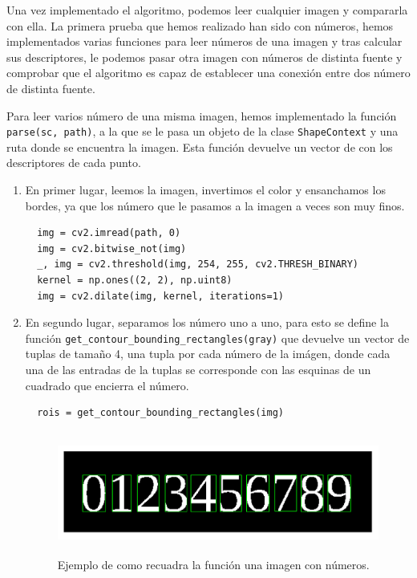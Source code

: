 \documentclass[size=a4, parskip=half, titlepage=false, toc=flat, toc=bib, 12pt]{scrartcl}
\begin{document}
Una vez implementado el algoritmo, podemos leer cualquier imagen y compararla con ella. La primera prueba que hemos realizado han sido con números, hemos implementados varias funciones para leer números de una imagen y tras calcular sus descriptores, le podemos pasar otra imagen con números de distinta fuente y comprobar que el algoritmo es capaz de establecer una conexión entre dos número de distinta fuente.

Para leer varios número de una misma imagen, hemos implementado la función \verb|parse(sc, path)|, a la que se le pasa un objeto de la clase \verb|ShapeContext| y una ruta donde se encuentra la imagen. Esta función devuelve un vector de con los descriptores de cada punto.
\begin{enumerate}

\item En primer lugar, leemos la imagen, invertimos el color y ensanchamos los bordes, ya que los número que le pasamos a la imagen a veces son muy finos.

\begin{verbatim}
  img = cv2.imread(path, 0)
  img = cv2.bitwise_not(img)
  _, img = cv2.threshold(img, 254, 255, cv2.THRESH_BINARY)
  kernel = np.ones((2, 2), np.uint8)
  img = cv2.dilate(img, kernel, iterations=1)
\end{verbatim}

\item En segundo lugar, separamos los número uno a uno, para esto se define la función \verb|get_contour_bounding_rectangles(gray)| que devuelve un vector de tuplas de tamaño 4, una tupla por cada número de la imágen, donde cada una de las entradas de la tuplas se corresponde con las esquinas de un cuadrado que encierra el número.

\begin{verbatim}
  rois = get_contour_bounding_rectangles(img)
\end{verbatim}

\begin{figure}[H]
\centering
\includegraphics[height=4cm]{./img/numeros}
\caption{Ejemplo de como recuadra la función una imagen con números.}
\end{figure}


\end{enumerate}
\end{document}
